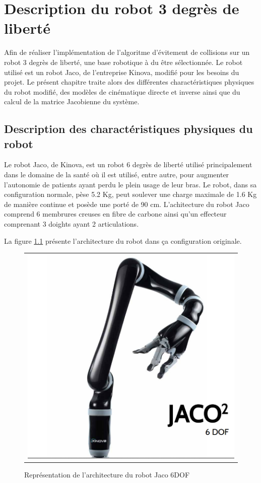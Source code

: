 \chapter{Description du robot 3 degrès de liberté}     %

Afin de réaliser l'implémentation de l'algoritme d'évitement de collisions sur un robot 3 degrès de liberté, une base robotique à du être sélectionnée.
Le robot utilisé est un robot Jaco, de l'entreprise Kinova, modifié pour les besoins du projet.
Le présent chapitre traite alors des différentes charactéristiques physiques du robot modifié, des modèles de cinématique directe et inverse ainsi que du calcul de la matrice Jacobienne du système.

\section{Description des charactéristiques physiques du robot}
Le robot Jaco, de Kinova, est un robot 6 degrès de liberté utilisé principalement dans le domaine de la santé où il est utilisé, entre autre, pour augmenter l'autonomie de patients ayant perdu le plein usage de leur bras.
Le robot, dans sa configuration normale, pèse 5.2 Kg, peut soulever une charge maximale de 1.6 Kg de manière continue et posède une porté de 90 cm.
L'achitecture du robot Jaco comprend 6 membrures creuses en fibre de carbone ainsi qu'un effecteur comprenant 3 doights ayant 2 articulations.

La figure \ref{fig:jaco_6dof} présente l'architecture du robot dans ça configuration originale.
\begin{figure}
 \begin{center}
  \begin{tabular}{c}
    \includegraphics[trim=0cm 0cm 0cm 0cm, scale=0.17]{"figures/jaco_6dof"}
  \end{tabular}
 \end{center}
\caption{Représentation de l'architecture du robot Jaco 6DOF}
 \label{fig:jaco_6dof}
\end{figure}

